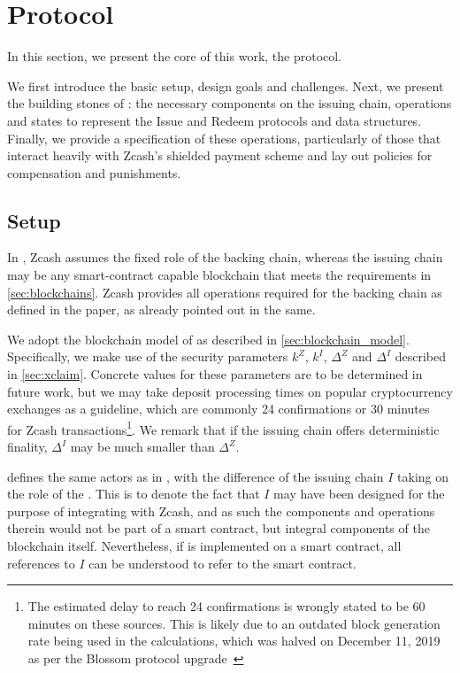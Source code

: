 
\chapter{Protocol}

In this section, we present the core of this work, the \zclaim protocol.

We first introduce the basic setup, design goals and challenges.
Next, we present the building stones of \zclaim: the necessary components on the issuing chain, operations and states to represent the Issue and Redeem protocols and data structures.
Finally, we provide a specification of these operations, particularly of those that interact heavily with Zcash's shielded payment scheme and lay out policies for compensation and punishments.


\section{Setup}
\label{sec:setup}

In \zclaim, Zcash assumes the fixed role of the backing chain, whereas the issuing chain may be any smart-contract capable blockchain that meets the requirements in \cref{sec:blockchains}.
Zcash provides all operations required for the backing chain as defined in the \xclaim paper, as already pointed out in the same.

We adopt the blockchain model of \xclaim as described in \cref{sec:blockchain_model}.
Specifically, we make use of the security parameters $k^Z$, $k^I$, $\Delta^Z$ and $\Delta^I$ described in \cref{sec:xclaim}.
Concrete values for these parameters are to be determined in future work, but we may take deposit processing times on popular cryptocurrency exchanges as a guideline, which are commonly 24 confirmations or 30 minutes~\cite{DepositProcessingTimesCoinbase,DepositProcessingTimesKraken,DepositProcessingTimesGemini} for Zcash transactions\footnote{The estimated delay to reach 24 confirmations is wrongly stated to be 60 minutes on these sources. This is likely due to an outdated block generation rate being used in the calculations, which was halved on December 11, 2019 as per the Blossom protocol upgrade~\cite{BlossomZcash}}.
We remark that if the issuing chain offers deterministic finality, $\Delta^I$ may be much smaller than $\Delta^Z$.

\zclaim defines the same actors as in \xclaim, with the difference of the issuing chain $I$ taking on the role of the \isc.
This is to denote the fact that $I$ may have been designed for the purpose of integrating with Zcash, and as such the components and operations therein would not be part of a smart contract, but integral components of the blockchain itself.
Nevertheless, if \zclaim is implemented on a smart contract, all references to $I$ can be understood to refer to the smart contract.

